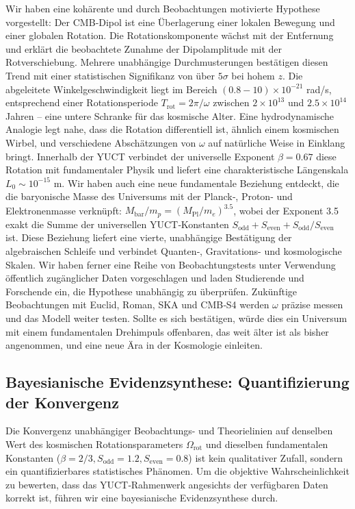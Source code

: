\documentclass[11pt,a4paper]{article}
\begin{document}
	Wir haben eine kohärente und durch Beobachtungen motivierte Hypothese vorgestellt: Der CMB‑Dipol ist eine Überlagerung einer lokalen Bewegung und einer globalen Rotation. Die Rotationskomponente wächst mit der Entfernung und erklärt die beobachtete Zunahme der Dipolamplitude mit der Rotverschiebung. Mehrere unabhängige Durchmusterungen bestätigen diesen Trend mit einer statistischen Signifikanz von über \(5\sigma\) bei hohem \(z\). Die abgeleitete Winkelgeschwindigkeit liegt im Bereich \((0.8-10)\times10^{-21}\) rad/s, entsprechend einer Rotationsperiode \(T_{\text{rot}} = 2\pi/\omega\) zwischen \(2\times10^{13}\) und \(2.5\times10^{14}\) Jahren – eine untere Schranke für das kosmische Alter. Eine hydrodynamische Analogie legt nahe, dass die Rotation differentiell ist, ähnlich einem kosmischen Wirbel, und verschiedene Abschätzungen von \(\omega\) auf natürliche Weise in Einklang bringt. Innerhalb der YUCT verbindet der universelle Exponent \(\beta = 0.67\) diese Rotation mit fundamentaler Physik und liefert eine charakteristische Längenskala \(L_0 \sim 10^{-15}\) m. Wir haben auch eine neue fundamentale Beziehung entdeckt, die die baryonische Masse des Universums mit der Planck‑, Proton- und Elektronenmasse verknüpft: \(M_{\mathrm{bar}}/m_p = (M_{\mathrm{Pl}}/m_e)^{3.5}\), wobei der Exponent 3.5 exakt die Summe der universellen YUCT‑Konstanten \(S_{\mathrm{odd}} + S_{\mathrm{even}} + S_{\mathrm{odd}}/S_{\mathrm{even}}\) ist. Diese Beziehung liefert eine vierte, unabhängige Bestätigung der algebraischen Schleife und verbindet Quanten‑, Gravitations- und kosmologische Skalen. Wir haben ferner eine Reihe von Beobachtungstests unter Verwendung öffentlich zugänglicher Daten vorgeschlagen und laden Studierende und Forschende ein, die Hypothese unabhängig zu überprüfen. Zukünftige Beobachtungen mit Euclid, Roman, SKA und CMB‑S4 werden \(\omega\) präzise messen und das Modell weiter testen. Sollte es sich bestätigen, würde dies ein Universum mit einem fundamentalen Drehimpuls offenbaren, das weit älter ist als bisher angenommen, und eine neue Ära in der Kosmologie einleiten.
	
	\subsection{Bayesianische Evidenzsynthese: Quantifizierung der Konvergenz}
	
	Die Konvergenz unabhängiger Beobachtungs- und Theorielinien auf denselben Wert des kosmischen Rotationsparameters \(\Omega_{\mathrm{rot}}\) und dieselben fundamentalen Konstanten (\(\beta=2/3, S_{\mathrm{odd}}=1.2, S_{\mathrm{even}}=0.8\)) ist kein qualitativer Zufall, sondern ein quantifizierbares statistisches Phänomen. Um die objektive Wahrscheinlichkeit zu bewerten, dass das YUCT‑Rahmenwerk angesichts der verfügbaren Daten korrekt ist, führen wir eine bayesianische Evidenzsynthese durch.
	
\end{document}
